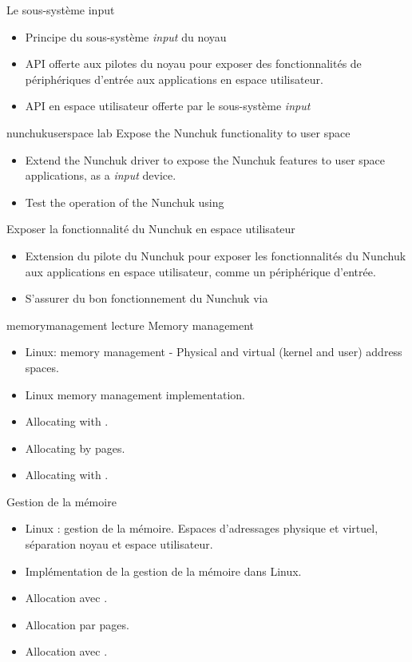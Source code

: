 {Le sous-système input}
{
  \begin{itemize}
  \item Principe du sous-système {\em input} du noyau
  \item API offerte aux pilotes du noyau pour exposer
    des fonctionnalités de périphériques d'entrée aux
    applications en espace utilisateur.
  \item API en espace utilisateur offerte par le
    sous-système {\em input}
  \end{itemize}
}
{nunchukuserspace}
{lab}
{Expose the Nunchuk functionality to user space}
{
  \begin{itemize}
  \item Extend the Nunchuk driver to expose the Nunchuk features to
    user space applications, as a {\em input} device.
  \item Test the operation of the Nunchuk using 
  \end{itemize}
}
{Exposer la fonctionnalité du Nunchuk en espace utilisateur}
{
  \begin{itemize}
  \item Extension du pilote du Nunchuk pour exposer les fonctionnalités
    du Nunchuk aux applications en espace utilisateur, comme
    un périphérique d'entrée.
  \item S'assurer du bon fonctionnement du Nunchuk via 
  \end{itemize}
}
{memorymanagement}
{lecture}
{Memory management}
{
  \begin{itemize}
  \item Linux: memory management - Physical and virtual (kernel and user) address spaces.
  \item Linux memory management implementation.
  \item Allocating with .
  \item Allocating by pages.
  \item Allocating with .
  \end{itemize}
}
{Gestion de la mémoire}
{
  \begin{itemize}
  \item Linux : gestion de la mémoire. Espaces d'adressages physique et
     virtuel, séparation noyau et espace utilisateur.
  \item Implémentation de la gestion de la mémoire dans Linux.
  \item Allocation avec .
  \item Allocation par pages.
  \item Allocation avec .
  \end{itemize}
}
